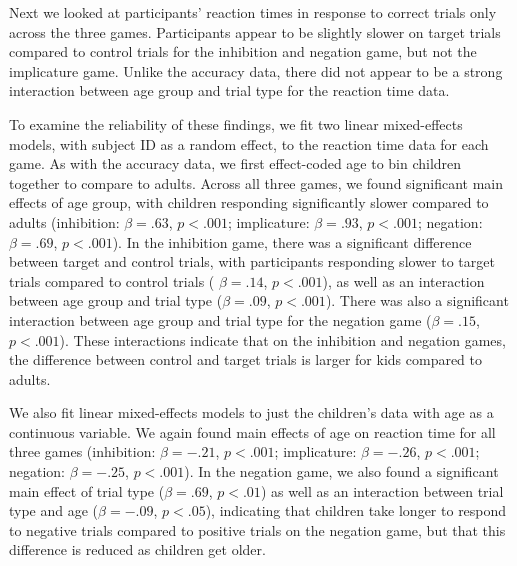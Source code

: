 \documentclass[10pt,letterpaper]{article}
\begin{document}
Next we looked at participants' reaction times in response to correct trials only across the three games.  Participants appear to be slightly slower on target trials compared to control trials for the inhibition and negation game, but not the implicature game.  Unlike the accuracy data, there did not appear to be a strong interaction between age group and trial type for the reaction time data.  

To examine the reliability of these findings, we fit two linear mixed-effects models, with subject ID as a random effect, to the reaction time data for each game.  As with the accuracy data, we first effect-coded age to bin children together to compare to adults.  Across all three games, we found significant main effects of age group, with children responding significantly slower compared to adults (inhibition: $\beta = .63$, $p< .001$; implicature: $\beta = .93$, $p< .001$; negation: $\beta = .69$, $p< .001$).  In the inhibition game, there was a significant difference between target and control trials, with participants responding slower to target trials compared to control trials ( $\beta = .14$, $p< .001$), as well as an interaction between age group and trial type ($\beta = .09$, $p< .001$).  There was also a significant interaction between age group and trial type for the negation game ($\beta = .15$, $p< .001$).  These interactions indicate that on the inhibition and negation games, the difference between control and target trials is larger for kids compared to adults.  

We also fit linear mixed-effects models to just the children's data with age as a continuous variable.  We again found main effects of age on reaction time for all three games (inhibition: $\beta = -.21$, $p< .001$; implicature: $\beta = -.26$, $p< .001$; negation: $\beta = -.25$, $p< .001$).  In the negation game, we also found a significant main effect of trial type ($\beta = .69$, $p< .01$) as well as an interaction between trial type and age ($\beta = -.09$, $p< .05$), indicating that children take longer to respond to negative trials compared to positive trials on the negation game, but that this difference is reduced as children get older.  
\end{document}
